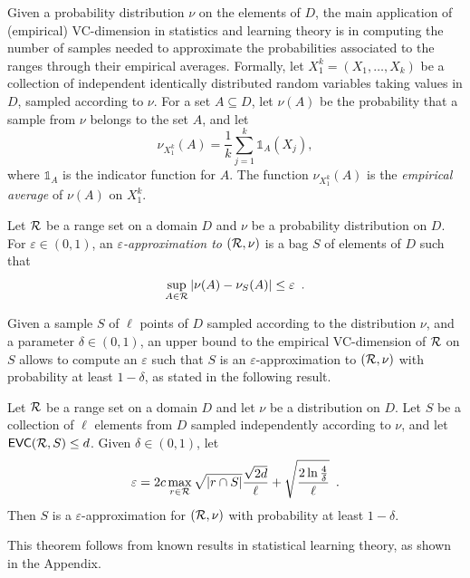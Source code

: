 Given a probability distribution $\nu$ on the elements of $D$, the main
application of (empirical) VC-dimension in statistics and learning theory is in
computing the number of samples needed to approximate the probabilities
associated to the ranges through their empirical averages.  Formally, let
$X_1^k=(X_1,\dotsc,X_k)$ be a collection of independent identically distributed
random variables taking values in $D$, sampled according to $\nu$.
For a set $A\subseteq D$, let $\nu(A)$ be the probability that a sample from
$\nu$ belongs to the set $A$, and let
\[
\nu_{X_1^k}(A)=\frac{1}{k}\sum_{j=1}^k\mathds{1}_A(X_j),\]
where $\mathds{1}_A$ is the indicator function for $A$. The function
$\nu_{X_1^k}(A)$ is the \emph{empirical average} of $\nu(A)$ on $X_1^k$.

\begin{definition}\label{def:eapprox}
  Let $\mathcal{R}$ be a range set on a domain
  $D$ and $\nu$ be a probability distribution on $D$. For $\varepsilon\in(0,1)$,
  an \emph{$\varepsilon$-approximation to $(\mathcal{R},\nu)$} is a bag $S$ of
  elements of $D$ such that
  \[
  \sup_{A\in\mathcal{R}}|\nu(A)-\nu_S(A)|\le\varepsilon\enspace.\]
\end{definition}

Given a sample $S$ of $\ell$ points of $D$ sampled according to the distribution
$\nu$, and a parameter $\delta\in(0,1)$, an upper bound to the empirical
VC-dimension of $\mathcal{R}$ on $S$ allows to compute an $\varepsilon$ such that $S$
is an $\varepsilon$-approximation to $(\mathcal{R},\nu)$ with probability at least
$1-\delta$, as stated in the following result.

\begin{theorem}\label{thm:eapproxempir}
	Let $\mathcal{R}$ be a range set on a domain $D$ and let $\nu$ be a distribution
	on $D$. Let $S$ be a collection of $\ell$ elements from $D$ sampled
	independently according to $\nu$, and let $\mathsf{EVC}(\mathcal{R},S)\le d$. Given
	$\delta\in(0,1)$, let
	\begin{equation}\label{eq:evceapprox}
		\varepsilon = 2c\max_{r\in\mathcal{R}}\sqrt{|r\cap S|}\frac{\sqrt{2d}}{\ell} +
		\sqrt{\frac{2\ln\frac{4}{\delta}}{\ell}}\enspace.
	\end{equation}
	Then $S$ is a $\varepsilon$-approximation for $(\mathcal{R},\nu)$ with
	probability at least $1-\delta$.
\end{theorem}
This theorem follows from known results in statistical learning theory, as shown
in the Appendix.

